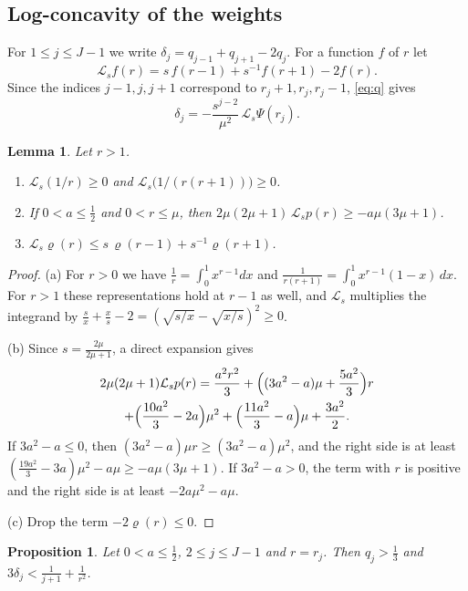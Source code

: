 \documentclass[11pt]{amsart}
\newtheorem{proposition}[theorem]{Proposition}
\newtheorem{lemma}[theorem]{Lemma}
\theoremstyle{definition}
\theoremstyle{remark}
\numberwithin{equation}{section}
\newcommand{\Ls}{\mathcal{L}_s}
\begin{document}
\subsection{Log-concavity of the weights}
For $1\le j\le J-1$ we write $\delta_j=q_{j-1}+q_{j+1}-2q_j$. For a function $f$ of $r$ let
\[
\Ls f(r)=s\,f(r-1)+s^{-1}f(r+1)-2f(r).
\]
Since the indices $j-1,j,j+1$ correspond to $r_j+1,r_j,r_j-1$, \eqref{eq:q} gives
\begin{equation}\label{eq:delta}
\delta_j=-\frac{s^{j-2}}{\mu^2}\,\Ls\Psi(r_j).
\end{equation}

\begin{lemma}\label{lem:Ls}
Let $r>1$.
\begin{enumerate}[label=\textup{(\alph*)}]
\item $\Ls(1/r)\ge0$ and $\Ls\bigl(1/(r(r+1))\bigr)\ge0$.
\item If $0<a\le\frac12$ and $0<r\le\mu$, then $2\mu(2\mu+1)\,\Ls p(r)\ge-a\mu(3\mu+1)$.
\item $\Ls\varrho(r)\le s\,\varrho(r-1)+s^{-1}\varrho(r+1)$.
\end{enumerate}
\end{lemma}

\begin{proof}
(a) For $r>0$ we have $\frac1r=\int_0^1x^{r-1}dx$ and $\frac1{r(r+1)}=\int_0^1x^{r-1}(1-x)\,dx$. For $r>1$ these representations hold at $r-1$ as well, and $\Ls$ multiplies the integrand by $\frac sx+\frac xs-2=(\sqrt{s/x}-\sqrt{x/s})^2\ge0$.

(b) Since $s=\frac{2\mu}{2\mu+1}$, a direct expansion gives
\begin{multline*}
2\mu(2\mu+1)\Ls p(r)=\frac{a^2r^2}3+\Bigl((3a^2-a)\mu+\frac{5a^2}3\Bigr)r\\
+\Bigl(\frac{10a^2}3-2a\Bigr)\mu^2+\Bigl(\frac{11a^2}3-a\Bigr)\mu+\frac{3a^2}2.
\end{multline*}
If $3a^2-a\le0$, then $(3a^2-a)\mu r\ge(3a^2-a)\mu^2$, and the right side is at least $(\frac{19a^2}3-3a)\mu^2-a\mu\ge-a\mu(3\mu+1)$. If $3a^2-a>0$, the term with $r$ is positive and the right side is at least $-2a\mu^2-a\mu$.

(c) Drop the term $-2\varrho(r)\le0$.
\end{proof}

\begin{proposition}\label{prop:internal}
Let $0<a\le\frac12$, $2\le j\le J-1$ and $r=r_j$. Then $q_j>\frac13$ and $3\delta_j<\frac1{j+1}+\frac1{r^2}$.
\end{proposition}
\end{document}
